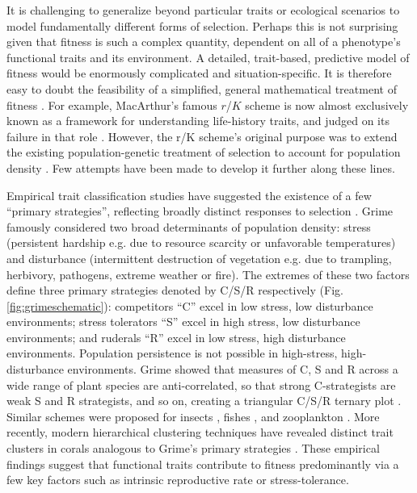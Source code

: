 \documentclass[11pt]{article}
\begin{document}
It is challenging to generalize beyond particular traits or ecological scenarios to model fundamentally different forms of selection. Perhaps this is not surprising given that fitness is such a complex quantity, dependent on all of a phenotype's functional traits \citep{violle_2007} and its environment. A detailed, trait-based, predictive model of fitness would be enormously complicated and situation-specific. It is therefore easy to doubt the feasibility of a simplified, general mathematical treatment of fitness \citep[p. 276]{ewens_2004}. For example, MacArthur's famous $r$/$K$ scheme \citep{macarthur_1962,macarthur_1967} is now almost exclusively known as a framework for understanding life-history traits, and judged on its failure in that role \citep{pianka_1970,stearns_1977,boyce_1984,reznick_2002}. However, the r/K scheme's original purpose was to extend the existing population-genetic treatment of selection to account for population density \citep{macarthur_1962}. Few attempts have been made to develop it further along these lines. 

Empirical trait classification studies have suggested the existence of a few ``primary strategies'', reflecting broadly distinct responses to selection \citep{winemiller_2015}. Grime famously considered \citep{grime_1974,grime_1977,grime_1988,westoby_1998} two broad determinants of population density: stress (persistent hardship e.g. due to resource scarcity or unfavorable temperatures) and disturbance (intermittent destruction of vegetation e.g. due to trampling, herbivory, pathogens, extreme weather or fire).  The extremes of these two factors define three primary strategies denoted by C/S/R respectively (Fig. \ref{fig:grimeschematic}): competitors ``C'' excel in low stress, low disturbance environments; stress tolerators ``S'' excel in high stress, low disturbance environments; and ruderals ``R''  excel in low stress, high disturbance environments. Population persistence is not possible in high-stress, high-disturbance environments. Grime showed that measures of C, S and R across a wide range of plant species are anti-correlated, so that strong C-strategists are weak S and R strategists, and so on, creating a triangular C/S/R ternary plot \citep{grime_1974}. Similar schemes were proposed for insects \citep{southwood_1977}, fishes \citep{winemiller_1992}, and zooplankton \citep{allan_76}. More recently, modern hierarchical clustering techniques have revealed distinct trait clusters in corals analogous to Grime's primary strategies \citep{darling_2012}. These empirical findings suggest that functional traits contribute to fitness predominantly via a few key factors such as intrinsic reproductive rate or stress-tolerance.
\end{document}
